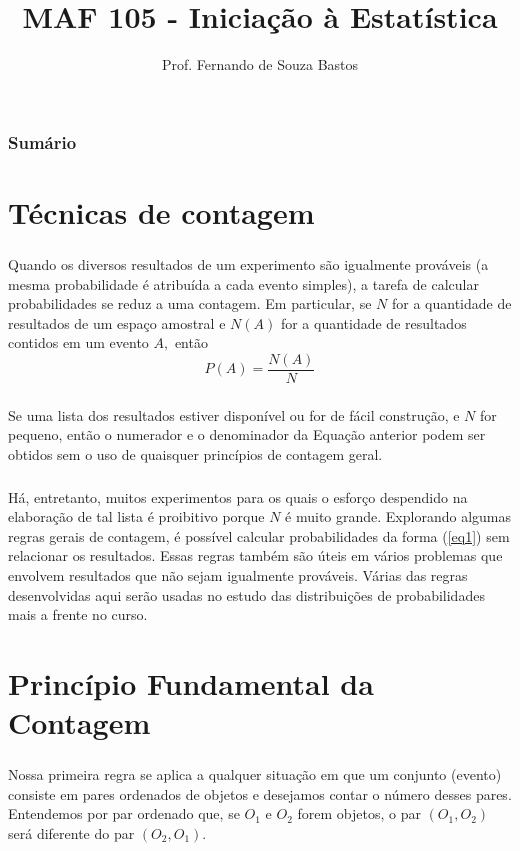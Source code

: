 \documentclass[14pt,aspectratio=1610]{beamer}
\title{MAF 105 - Iniciação à Estatística}
\author{Prof. Fernando de Souza Bastos}
\institute{Instituto de Ciências Exatas e Tecnológicas\texorpdfstring{\\ Universidade Federal de Viçosa}{}\texorpdfstring{\\ Campus UFV - Florestal}{}}
\date[\today]{}
\begin{document}


\frame{\titlepage}

\begin{frame}{}
\frametitle{\bf Sumário}
\tableofcontents
\end{frame}

\section{Técnicas de contagem}
\begin{frame}{}
\frametitle{}
\begin{block}{}
\justifying
Quando os diversos resultados de um experimento são igualmente prováveis (a mesma probabilidade é atribuída a cada evento simples), a tarefa de calcular probabilidades se reduz a uma contagem. Em particular, se $N$ for a quantidade de resultados de um espaço amostral e $N(A)$ for a quantidade de resultados contidos em um evento $A,$ então 
\begin{equation}\label{eq1}
P(A)=\dfrac{N(A)}{N}
\end{equation}
\end{block}
\end{frame}

\begin{frame}{}
\frametitle{}
\begin{block}{}
\justifying
Se uma lista dos resultados estiver disponível ou for de fácil construção, e $N$ for pequeno, então o numerador e o denominador da Equação anterior podem ser obtidos sem o uso de quaisquer princípios de contagem geral.
\end{block}
\end{frame}

\begin{frame}{}
\frametitle{}
\begin{block}{}
\justifying
Há, entretanto, muitos experimentos para os quais o esforço despendido na elaboração de tal lista é proibitivo porque $N$ é muito grande. Explorando algumas regras gerais de contagem, é possível calcular probabilidades da forma (\ref{eq1}) sem relacionar os resultados. Essas regras também são úteis em vários problemas que envolvem resultados que não sejam igualmente prováveis. Várias das regras desenvolvidas aqui serão usadas
no estudo das distribuições de probabilidades mais a frente no curso.
\end{block}
\end{frame}

\section{Princípio Fundamental da Contagem}
\begin{frame}{}
\frametitle{}
\begin{block}{}
\justifying
Nossa primeira regra se aplica a qualquer situação em que um conjunto (evento) consiste em pares ordenados de objetos e desejamos contar o número desses pares. Entendemos por par ordenado que, se $O_{1}$ e $O_{2}$ forem objetos, o par $(O_1, O_2)$ será diferente do par $(O_2, O_1).$
\end{block}
\end{frame}
\end{document}
